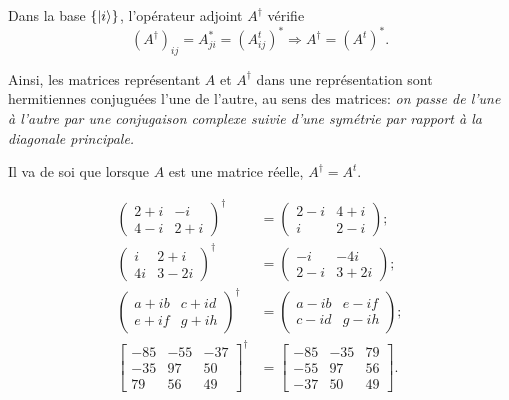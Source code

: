 Dans la base $\{\vert i\rangle\}$, l'opérateur adjoint $A^{\dag}$ vérifie%
\begin{equation}
(A^{\dag})_{ij}=A_{ji}^{\ast}=(A_{ij}^{t})^{\ast}\Rightarrow A^{\dag}
=(A^{t})^{\ast}.
\end{equation}

Ainsi, les matrices représentant $A$ et $A^{\dag}$ dans une représentation
sont hermitiennes conjuguées l'une de l'autre, au sens des matrices: \emph{on
passe de l'une à l'autre par une conjugaison complexe suivie d'une symétrie
par rapport à la diagonale principale. }

Il va de soi que lorsque $A$ est une matrice réelle, $A^{\dag}=A^{t}$.
\begin{example}%
\begin{subequations}%
\begin{align}
\begin{pmatrix}
2+i & -i\\
4-i & 2+i
\end{pmatrix} ^{\dag}  &  =\begin{pmatrix}
2-i & 4+i\\
i & 2-i
\end{pmatrix} ;\\
\begin{pmatrix}
i & 2+i\\
4i & 3-2i
\end{pmatrix} ^{\dag}  &  =\allowbreak\begin{pmatrix}
-i & -4i\\
2-i & 3+2i
\end{pmatrix} ;\\
\begin{pmatrix}
a+ib & c+id\\
e+if & g+ih
\end{pmatrix} ^{\dag}  &  =\allowbreak\begin{pmatrix}
a-ib & e-if\\
c-id & g-ih%
\end{pmatrix} ;\\
\begin{bmatrix}
-85 & -55 & -37\\
-35 & 97 & 50\\
79 & 56 & 49
\end{bmatrix}^{\dag}  &  =\begin{bmatrix}
-85 & -35 & 79\\
-55 & 97 & 56\\
-37 & 50 & 49
\end{bmatrix}.
\end{align}
\end{subequations}%

\end{example}

